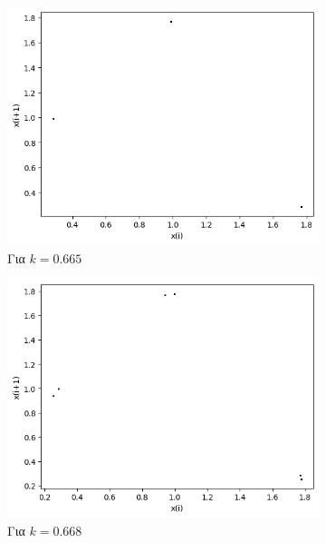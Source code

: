 \begin{figure}
\begin{subfigure}[b]{0.4\textwidth}
		\includegraphics[width=\textwidth]{LateX images/graphs q09/g9}
		\caption{Για $k=0.665$}
		\label{f:k55}
	\end{subfigure}
	\hfill
	\begin{subfigure}[b]{0.4\textwidth}
		\centering
		\includegraphics[width=\textwidth]{LateX images/graphs q09/g10}
		\caption{Για $k=0.668$}
		\label{f:k56}
	\end{subfigure}
	\hfill
	\begin{subfigure}[b]{0.4\textwidth}
		\centering

\end{subfigure}
\end{figure}
